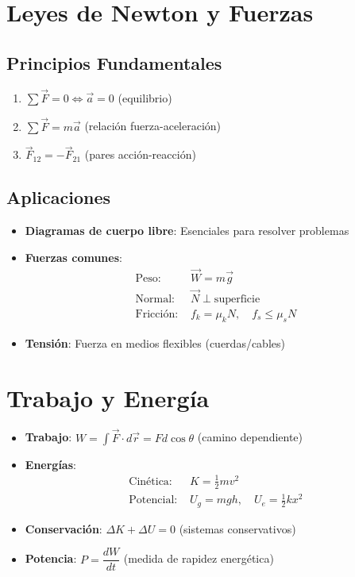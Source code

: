 \documentclass[12pt, a4paper, spanish]{article}
\begin{document}
\section{Leyes de Newton y Fuerzas}
\subsection{Principios Fundamentales}
\begin{enumerate}
    \item $\sum \vec{F} = 0 \Leftrightarrow \vec{a} = 0$ (equilibrio)
    \item $\sum \vec{F} = m\vec{a}$ (relación fuerza-aceleración)
    \item $\vec{F}_{12} = -\vec{F}_{21}$ (pares acción-reacción)
\end{enumerate}

\subsection{Aplicaciones}
\begin{itemize}
    \item \textbf{Diagramas de cuerpo libre}: Esenciales para resolver problemas
    \item \textbf{Fuerzas comunes}:
    \begin{align*}
    \text{Peso: } &\vec{W} = m\vec{g} \\
    \text{Normal: } &\vec{N} \perp \text{superficie} \\
    \text{Fricción: } &f_k = \mu_k N, \quad f_s \leq \mu_s N
    \end{align*}
    \item \textbf{Tensión}: Fuerza en medios flexibles (cuerdas/cables)
\end{itemize}

\section{Trabajo y Energía}
\begin{itemize}
    \item \textbf{Trabajo}: $W = \int \vec{F} \cdot d\vec{r} = Fd\cos\theta$ (camino dependiente)
    \item \textbf{Energías}:
    \begin{align*}
    \text{Cinética: } &K = \frac{1}{2}mv^2 \\
    \text{Potencial: } &U_g = mgh, \quad U_e = \frac{1}{2}kx^2
    \end{align*}
    \item \textbf{Conservación}: $\Delta K + \Delta U = 0$ (sistemas conservativos)
    \item \textbf{Potencia}: $P = \dfrac{dW}{dt}$ (medida de rapidez energética)
\end{itemize}
\end{document}
